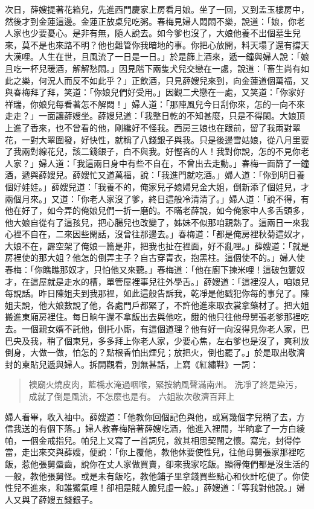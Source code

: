 次日，薛嫂提著花箱兒，先進西門慶家上房看月娘。坐了一回，又到孟玉樓房中，然後才到金蓮這邊。金蓮正放桌兒吃粥。春梅見婦人悶悶不樂，說道：「娘，你老人家也少要憂心。是非有無，隨人說去。如今爹也沒了，大娘他養不出個墓生兒來，莫不是也來路不明？他也難管你我暗地的事。你把心放開，料天塌了還有撐天大漢哩。人生在世，且風流了一日是一日。」於是篩上酒來，遞一鐘與婦人說：「娘且吃一杯兒暖酒，解解愁悶。」因見階下兩隻犬兒交戀在一處，說道：「畜生尚有如此之樂，何況人而反不如此乎？」正飲酒，只見薛嫂兒來到，向金蓮道個萬福，又與春梅拜了拜，笑道：「你娘兒們好受用。」因觀二犬戀在一處，又笑道：「你家好祥瑞，你娘兒每看著怎不解悶！」婦人道：「那陣風兒今日刮你來，怎的一向不來走走？」一面讓薛嫂坐。薛嫂兒道：「我整日乾的不知甚麼，只是不得閑。大娘頂上進了香來，也不曾看的他，剛纔好不怪我。西房三娘也在跟前，留了我兩對翠花，一對大翠圍發，好快性，就稱了八錢銀子與我。只是後邊雪姑娘，從八月里要了我兩對線花兒，該二錢銀子，白不與我。好慳吝的人！我對你說，怎的不見你老人家？」婦人道：「我這兩日身中有些不自在，不曾出去走動。」春梅一面篩了一鐘酒，遞與薛嫂兒。薛嫂忙又道萬福，說：「我進門就吃酒。」婦人道：「你到明日養個好娃娃。」薛嫂兒道：「我養不的，俺家兒子媳婦兒金大姐，倒新添了個娃兒，才兩個月來。」又道：「你老人家沒了爹，終日這般冷清清了。」婦人道：「說不得，有他在好了，如今弄的俺娘兒們一折一磨的。不瞞老薛說，如今俺家中人多舌頭多，他大娘自從有了這孩兒，把心腸兒也改變了，姊妹不似那咱親熱了。這兩日一來我心裡不自在，二來因些閑話，沒曾往那邊去。」春梅道：「都是俺房裡秋菊這奴才，大娘不在，霹空架了俺娘一篇是非，把我也扯在裡面，好不亂哩。」薛嫂道：「就是房裡使的那大姐？他怎的倒弄主子？自古穿青衣，抱黑柱。這個使不的。」婦人使春梅：「你瞧瞧那奴才，只怕他又來聽。」春梅道：「他在廚下揀米哩！這破包簍奴才，在這屋就是走水的槽，單管屋裡事兒往外學舌。」薛嫂道：「這裡沒人，咱娘兒每說話。昨日陳姐夫到我那裡，如此這般告訴我，乾凈是他戳犯你每的事兒了。陳姐夫說，他大娘數說了他，各處門戶都緊了，不許他進來取衣裳拿藥材了。把大姐搬進東廂房裡住。每日晌午還不拿飯出去與他吃，餓的他只往他母舅張老爹那裡吃去。一個親女婿不託他，倒托小廝，有這個道理？他有好一向沒得見你老人家，巴巴央及我，稍了個柬兒，多多拜上你老人家，少要心焦，左右爹也是沒了，爽利放倒身，大做一做，怕怎的？點根香怕出煙兒；放把火，倒也罷了。」於是取出敬濟封的柬貼兒遞與婦人。拆開觀看，別無甚話，上寫《紅繡鞋》一詞：
\begin{quote}
襖廟火燒皮肉，藍橋水淹過咽喉，緊按納風聲滿南州。
洗凈了終是染污，成就了倒是風流，不怎麼也是有。
六姐妝次敬濟百拜上
\end{quote}

婦人看畢，收入袖中。薛嫂道：「他教你回個記色與他，或寫幾個字兒稍了去，方信我送的有個下落。」婦人教春梅陪著薛嫂吃酒，他進入裡間，半晌拿了一方白綾帕，一個金戒指兒。帕兒上又寫了一首詞兒，敘其相思契闊之懷。寫完，封得停當，走出來交與薛嫂，便說：「你上覆他，教他休要使性兒，往他母舅張家那裡吃飯，惹他張舅蜃齒，說你在丈人家做買賣，卻來我家吃飯。顯得俺們都是沒生活的一般，教他張舅怪。或是未有飯吃，教他鋪子里拿錢買些點心和伙計吃便了。你使性兒不進來，和誰鱉氣哩！卻相是賊人膽兒虛一般。」薛嫂道：「等我對他說。」婦人又與了薛嫂五錢銀子。

